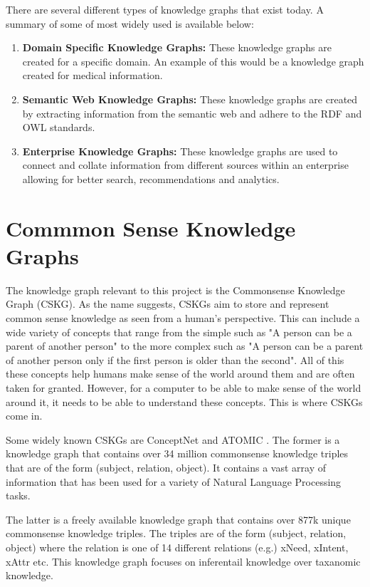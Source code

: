 \documentclass[\main/thesis.tex]{subfiles}
\begin{document}
There are several different types of knowledge graphs that exist today. A summary of some of 
most widely used is available below: 

\begin{enumerate}
    \item \textbf{Domain Specific Knowledge Graphs:} These knowledge graphs are created for a
    specific domain. An example of this would be a knowledge graph created for medical information. 
    \item \textbf{Semantic Web Knowledge Graphs:} These knowledge graphs are created by
    extracting information from the semantic web and adhere to the RDF and OWL standards.
    \item \textbf{Enterprise Knowledge Graphs:} These knowledge graphs are used to connect 
    and collate information from different sources within an enterprise allowing for better 
    search, recommendations and analytics.
\end{enumerate}

\section{Commmon Sense Knowledge Graphs}\label{sec:commonsenseKnowledgeGraphs}

The knowledge graph relevant to this project is the Commonsense Knowledge Graph (CSKG). 
As the name suggests, CSKGs aim to store and represent common sense knowledge as seen 
from a human's perspective. This can include a wide variety of concepts that range from
the simple such as "A person can be a parent of another person" to the more complex such as
"A person can be a parent of another person only if the first person is older than the second".
All of this these concepts help humans make sense of the world around them and are 
often taken for granted. However, for a computer to be able to make sense of the world
around it, it needs to be able to understand these concepts. This is where CSKGs come in.

Some widely known CSKGs are ConceptNet \cite{speer2018conceptnet} and 
ATOMIC \cite{sap_atomic_2018}. 
The former is a knowledge graph that contains over 34 million commonsense knowledge triples
that are of the form (subject, relation, object). It contains a vast array of information 
that has been used for a variety of Natural Language Processing tasks. 

The latter is a freely available knowledge graph that contains over 877k unique commonsense 
knowledge triples. The triples are of the form (subject, relation, object) where the 
relation is one of 14 different relations (e.g.) xNeed, xIntent, xAttr etc. 
This knowledge graph focuses on inferentail knowledge over taxanomic knowledge.
\end{document}
